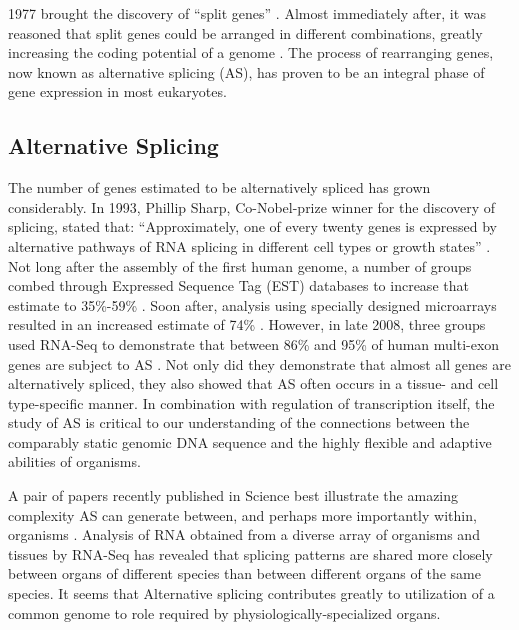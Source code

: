   1977 brought the discovery of ``split genes'' \citep{Berget1977a,Chow1977}. Almost immediately after, it was reasoned that split genes could be arranged in different combinations, greatly increasing the coding potential of a genome \citep{Gilbert1978a}. The process of rearranging genes, now known as alternative splicing (AS), has proven to be an integral phase of gene expression in most eukaryotes. 

  \subsection{Alternative Splicing}\label{Intro:subsec:Alternative Splicing}

    The number of genes estimated to be alternatively spliced has grown considerably. In 1993, Phillip Sharp, Co-Nobel-prize winner for the discovery of splicing, stated that: ``Approximately, one of every twenty genes is expressed by alternative pathways of RNA splicing in different cell types or growth states'' \cite{Sharp2014}. Not long after the assembly of the first human genome, a number of groups combed through Expressed Sequence Tag (EST) databases to increase that estimate to 35\%-59\% \citep{Modrek2002}. Soon after, analysis using specially designed microarrays resulted in an increased estimate of 74\% \citep{Johnson2003}. However, in late 2008, three groups used RNA-Seq to demonstrate that between 86\% and 95\% of human multi-exon genes are subject to AS \citep{Pan2008, Wang2008, Sultan2008}. Not only did they demonstrate that almost all genes are alternatively spliced, they also showed that AS often occurs in a tissue- and cell type-specific manner. In combination with regulation of transcription itself, the study of AS is critical to our understanding of the connections between the comparably static genomic DNA sequence and the highly flexible and adaptive abilities of organisms.

    A pair of papers recently published in Science best illustrate the amazing complexity AS can generate between, and perhaps more importantly within, organisms \citep{Barbosa-Morais2012,Merkin2012}. Analysis of RNA obtained from a diverse array of organisms and tissues by RNA-Seq has revealed that splicing patterns are shared more closely between organs of different species than between different organs of the same species. It seems that Alternative splicing contributes greatly to utilization of a common genome to role required by physiologically-specialized organs. 

